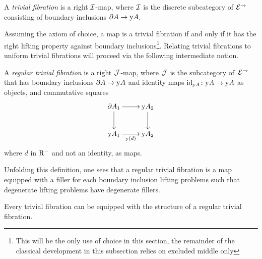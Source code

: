 \documentclass[reqno,10pt,a4paper,oneside,draft]{amsart}
\begin{document}
\begin{definition}
A \emph{trivial fibration} is a right $\cal{I}$-map, where $\cal{I}$ is the discrete subcategory of $\cal{E}^{\to}$ consisting of boundary inclusions $\partial A \to \yon A$.
\end{definition}

Assuming the axiom of choice, a map is a trivial fibration if and only if it has the right lifting property against boundary inclusions\footnote{This will be the only use of choice in this section, the remainder of the classical development in this subsection relies on excluded middle only}.
Relating trivial fibrations to uniform trivial fibrations will proceed via the following intermediate notion.

\begin{definition}
A \emph{regular trivial fibration} is a right $\cal{J}$-map, where $\cal{J}$ is the subcategory of~$\cal{E}^{\to}$ that has boundary inclusions $\partial A \to \yon A$ and identity maps $\id_{\yon A} \co \yon A \to \yon A$ as objects, and commutative squares
\[
\xymatrix{
  \partial A_1
  \ar[r]
  \ar[d]
&
  \yon A_2
  \ar[d]
\\
  \yon A_1
  \ar[r]_{\yon(d)}
&
  \yon A_2
}
\]
where $d$ in $\Rm$ and not an identity, as maps.
\end{definition}

Unfolding this definition, one sees that a regular trivial fibration is a map equipped with a filler for each boundary inclusion lifting problems such that degenerate lifting problems have degenerate fillers.

\begin{proposition} \label{trivial-fibration-to-regular}
Every trivial fibration can be equipped with the structure of a regular trivial fibration.
\end{proposition}
\end{document}
